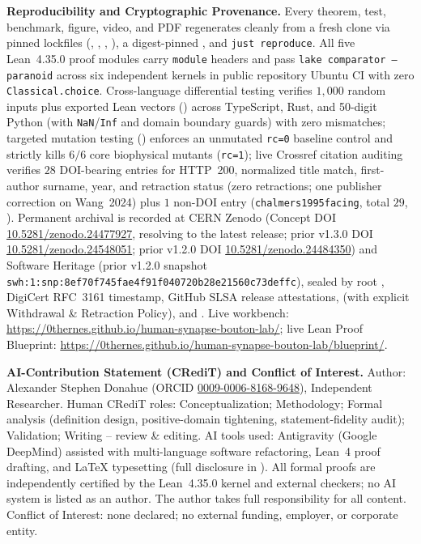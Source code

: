 \documentclass[11pt,letterpaper]{amsart}
\begin{document}
\textbf{Reproducibility and Cryptographic Provenance.} Every theorem, test, benchmark, figure, video, and PDF regenerates cleanly from a fresh clone via pinned lockfiles (, , , ), a digest-pinned , and \texttt{just reproduce}. All five Lean~4.35.0 proof modules carry \texttt{module} headers and pass \texttt{lake comparator --paranoid} across six independent kernels in public repository Ubuntu CI with zero \texttt{Classical.choice}. Cross-language differential testing verifies $1{,}000$ random inputs plus exported Lean vectors () across TypeScript, Rust, and 50-digit Python (with \texttt{NaN}/\texttt{Inf} and domain boundary guards) with zero mismatches; targeted mutation testing () enforces an unmutated \texttt{rc=0} baseline control and strictly kills $6/6$ core biophysical mutants (\texttt{rc=1}); live Crossref citation auditing verifies $28$ DOI-bearing entries for HTTP~200, normalized title match, first-author surname, year, and retraction status (zero retractions; one publisher correction on Wang~2024) plus $1$ non-DOI entry (\texttt{chalmers1995facing}, total $29$, ). Permanent archival is recorded at CERN Zenodo (Concept DOI \href{https://doi.org/10.5281/zenodo.24477927}{10.5281/zenodo.24477927}, resolving to the latest release; prior v1.3.0 DOI \href{https://doi.org/10.5281/zenodo.24548051}{10.5281/zenodo.24548051}; prior v1.2.0 DOI \href{https://doi.org/10.5281/zenodo.24484350}{10.5281/zenodo.24484350}) and Software Heritage (prior v1.2.0 snapshot \nolinkurl{swh:1:snp:8ef70f745fae4f91f040720b28e21560c73deffc}), sealed by root , DigiCert RFC~3161 timestamp, GitHub SLSA release attestations,  (with explicit Withdrawal \& Retraction Policy), and . Live workbench: \url{https://0thernes.github.io/human-synapse-bouton-lab/}; live Lean Proof Blueprint: \url{https://0thernes.github.io/human-synapse-bouton-lab/blueprint/}.

\textbf{AI-Contribution Statement (CRediT) and Conflict of Interest.} Author: Alexander Stephen Donahue (ORCID \href{https://orcid.org/0009-0006-8168-9648}{0009-0006-8168-9648}), Independent Researcher. Human CRediT roles: Conceptualization; Methodology; Formal analysis (definition design, positive-domain tightening, statement-fidelity audit); Validation; Writing -- review \& editing. AI tools used: Antigravity (Google DeepMind) assisted with multi-language software refactoring, Lean~4 proof drafting, and LaTeX typesetting (full disclosure in ). All formal proofs are independently certified by the Lean~4.35.0 kernel and external checkers; no AI system is listed as an author. The author takes full responsibility for all content. Conflict of Interest: none declared; no external funding, employer, or corporate entity.



\end{document}
